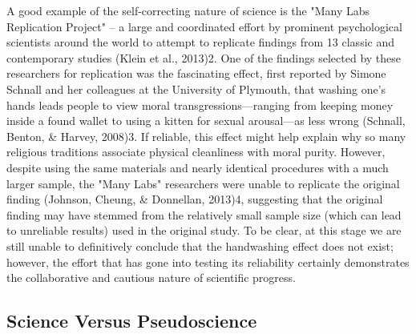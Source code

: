A good example of the self-correcting nature of science is the "Many Labs Replication Project" -- a large and coordinated effort by prominent psychological scientists around the world to attempt to replicate findings from 13 classic and contemporary studies (Klein et al., 2013)2. One of the findings selected by these researchers for replication was the fascinating effect, first reported by Simone Schnall and her colleagues at the University of Plymouth, that washing one's hands leads people to view moral transgressions---ranging from keeping money inside a found wallet to using a kitten for sexual arousal---as less wrong (Schnall, Benton, \& Harvey, 2008)3. If reliable, this effect might help explain why so many religious traditions associate physical cleanliness with moral purity. However, despite using the same materials and nearly identical procedures with a much larger sample, the "Many Labs" researchers were unable to replicate the original finding (Johnson, Cheung, \& Donnellan, 2013)4, suggesting that the original finding may have stemmed from the relatively small sample size (which can lead to unreliable results) used in the original study. To be clear, at this stage we are still unable to definitively conclude that the handwashing effect does not exist; however, the effort that has gone into testing its reliability certainly demonstrates the collaborative and cautious nature of scientific progress.

\subsection{Science Versus Pseudoscience}


